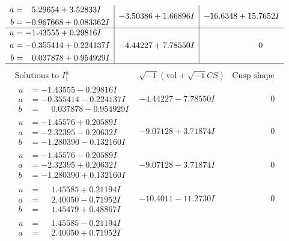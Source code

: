 \documentclass[1p]{elsarticle_modified}
\theoremstyle{definition}
\newcommand{\I}{\sqrt{-1}}
\begin{document}
$$\begin{array}{c|c|c}
\begin{aligned}
a &= \phantom{-}5.29654 + 3.52833 I \\
b &= -0.967668 + 0.083362 I\end{aligned}
 & -3.50386 + 1.66896 I & -16.6348 + 15.7652 I \\ \hline\begin{aligned}
u &= -1.43555 + 0.29816 I \\
a &= -0.355414 + 0.224137 I \\
b &= \phantom{-}0.037878 + 0.954929 I\end{aligned}
 & -4.44227 + 7.78550 I & \phantom{-0.000000 } 0\\
 \hline 
 \end{array}$$\newpage$$\begin{array}{c|c|c}  
\text{Solutions to }I^u_{1}& \I (\text{vol} + \sqrt{-1}CS) & \text{Cusp shape}\\
 \hline 
\begin{aligned}
u &= -1.43555 - 0.29816 I \\
a &= -0.355414 - 0.224137 I \\
b &= \phantom{-}0.037878 - 0.954929 I\end{aligned}
 & -4.44227 - 7.78550 I & \phantom{-0.000000 } 0 \\ \hline\begin{aligned}
u &= -1.45576 + 0.20589 I \\
a &= -2.32395 - 0.20632 I \\
b &= -1.280390 - 0.132160 I\end{aligned}
 & -9.07128 + 3.71874 I & \phantom{-0.000000 } 0 \\ \hline\begin{aligned}
u &= -1.45576 - 0.20589 I \\
a &= -2.32395 + 0.20632 I \\
b &= -1.280390 + 0.132160 I\end{aligned}
 & -9.07128 - 3.71874 I & \phantom{-0.000000 } 0 \\ \hline\begin{aligned}
u &= \phantom{-}1.45585 + 0.21194 I \\
a &= \phantom{-}2.40050 - 0.71952 I \\
b &= \phantom{-}1.45479 + 0.48867 I\end{aligned}
 & -10.4011 - 11.2730 I & \phantom{-0.000000 } 0 \\ \hline\begin{aligned}
u &= \phantom{-}1.45585 - 0.21194 I \\
a &= \phantom{-}2.40050 + 0.71952 I \\

\end{aligned}
\end{array}$$
\end{document}
